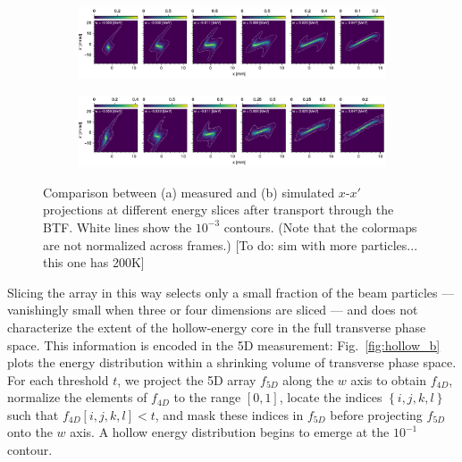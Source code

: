 \documentclass[letterpaper,
               keeplastbox,
               nospread,
               biblatex,
              ]{jacow}
\begin{document}
%
\begin{figure}[!t]
    \centering
    \vfill
    \vfill
    \begin{subfigure}{\textwidth}
        \includegraphics[width=\textwidth]{VS34_energy_slice2.pdf}
        \caption{}
        \label{fig:VS34_c}
    \end{subfigure}
    \vfill
    \vfill
    \begin{subfigure}{\textwidth}
        \includegraphics[width=\textwidth]{VS34_energy_slices_sim2.pdf}
        \caption{}
        \label{fig:VS34_d}
    \end{subfigure}
    \caption{Comparison between (a) measured and (b) simulated $x$-$x'$ projections at different energy slices after transport through the BTF. White lines show the $10^{-3}$ contours. (Note that the colormaps are not normalized across frames.) [To do: sim with more particles... this one has 200K]}
    \label{fig:VS34}
\end{figure}
%

Slicing the array in this way selects only a small fraction of the beam particles — vanishingly small when three or four dimensions are sliced — and does not characterize the extent of the hollow-energy core in the full transverse phase space. This information is encoded in the 5D measurement: Fig.~\ref{fig:hollow_b} plots the energy distribution within a shrinking volume of transverse phase space. For each threshold $t$, we project the 5D array $f_{5D}$ along the $w$ axis to obtain $f_{4D}$, normalize the elements of $f_{4D}$ to the range $[0, 1]$, locate the indices $\left\{i, j, k, l\right\}$ such that $f_{4D}[i, j, k, l] < t$, and mask these indices in $f_{5D}$ before projecting $f_{5D}$ onto the $w$ axis. A hollow energy distribution begins to emerge at the $10^{-1}$ contour.
\end{document}
